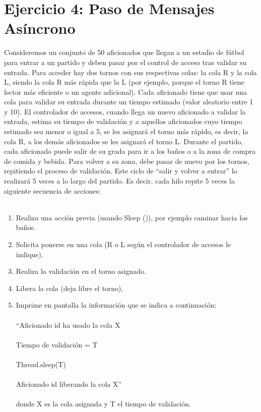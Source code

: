 \documentclass[a4paper,12pt,titlepage,oneside]{article}
\begin{document}
    \section{Ejercicio 4: Paso de Mensajes Asíncrono}
    \iffalse
    Consideremos un conjunto de 50 aficionados que llegan a un estadio de fútbol para entrar a un 
    partido y deben pasar por el control de acceso tras validar su entrada. Para acceder hay dos 
    tornos con sus respectivas colas: la cola R y la cola L, siendo la cola R más rápida que la L (por 
    ejemplo, porque el torno R tiene lector más eficiente o un agente adicional). Cada aficionado 
    tiene que usar una cola para validar su entrada durante un tiempo estimado (valor aleatorio 
    entre 1 y 10). El controlador de accesos, cuando llega un nuevo aficionado a validar la entrada, 
    estima su tiempo de validación y a aquellos aficionados cuyo tiempo estimado sea menor o 
    igual a 5, se les asignará el torno más rápido, es decir, la cola R, a los demás aficionados se les 
    asignará el torno L. Durante el partido, cada aficionado puede salir de su grada para ir a los 
    baños o a la zona de compra de comida y bebida. Para volver a su zona, debe pasar de nuevo 
    por los tornos, repitiendo el proceso de validación. Este ciclo de “salir y volver a entrar” lo 
    realizará 5 veces a lo largo del partido. Es decir, cada hilo repite 5 veces la siguiente secuencia 
    de acciones: \\
    \\
    \begin{enumerate}
        
    \item Realiza una acción previa (usando Sleep ()), por ejemplo caminar hacia los baños. 
    \item Solicita ponerse en una cola (R o L según el controlador de accesos le indique). 
    \item Realiza la validación en el torno asignado. 
    \item Libera la cola (deja libre el torno), 
    \item Imprime en pantalla la información que se indica a continuación:\\
    \\
    \textcolor{black!70}{
    \hspace*{2em}“Aficionado id ha usado la cola X \\
    \\
    \hspace*{2em}Tiempo de validación = T \\
    \\
    \hspace*{2em}Thread.sleep(T) \\
    \\
    \hspace*{2em}Aficionado id liberando la cola X” \\
    \\
    }
    donde X es la cola asignada y T el tiempo de validación. 
    \end{enumerate}
\end{document}
